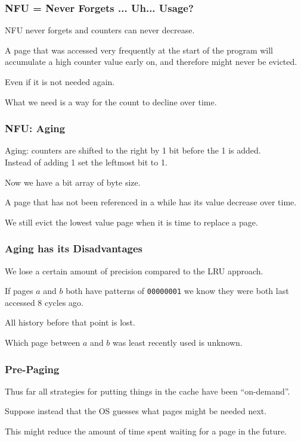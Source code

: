 \begin{frame}
\frametitle{NFU = Never Forgets ... Uh... Usage?}

NFU never forgets and counters can never decrease. 

A page that was accessed very frequently at the start of the program will accumulate a high counter value early on, and therefore might never be evicted.

Even if it is not needed again. 

What we need is a way for the count to decline over time. 



\end{frame}

\begin{frame}
\frametitle{NFU: Aging}

\alert{Aging}: counters are shifted to the right by 1 bit before the 1 is added.\\
\quad Instead of adding 1 set the leftmost bit to 1. 

Now we have a bit array of byte size.

A page that has not been referenced in a while has its value decrease over time. 

We still evict the lowest value page when it is time to replace a page.

\end{frame}

\begin{frame}
\frametitle{Aging has its Disadvantages}

We lose a certain amount of precision compared to the LRU approach.

If pages $a$ and $b$ both have patterns of \texttt{00000001} we know they were both last accessed 8 cycles ago. 

All history before that point is lost. 

Which page between $a$ and $b$ was least recently used is unknown.


\end{frame}

\begin{frame}
\frametitle{Pre-Paging}

Thus far all strategies for putting things in the cache have been ``on-demand''.
 
Suppose instead that the OS guesses what pages might be needed next.

This might reduce the amount of time spent waiting for a page in the future.

\end{frame}

